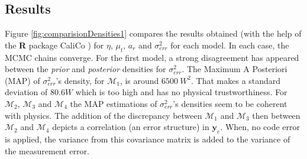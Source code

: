 \documentclass[soumission]{jsfds}
\begin{document}
\subsection{Results}

Figure \ref{fig:comparisionDensities1} compares the results obtained (with the help of the \textbf{R} package CaliCo \citep{CaliCo}) 
for $\eta$, $\mu_t$, $a_r$ and $\sigma_{err}^2$ for each model. In each case, the MCMC chains converge. 
For the first model, a strong disagreement has appeared between the \textit{prior} and \textit{posterior} densities for $\sigma_{err}^2$. 
The Maximum A Posteriori (MAP) of $\sigma_{err}^2$'s density, for $\mathcal{M}_1$,
 is around $6500\ W^2$. That makes a standard deviation of $80.6W$ which is too high and has no physical trustworthiness. 
For $\mathcal{M}_2$, $\mathcal{M}_3$ and $\mathcal{M}_4$ the MAP estimations of $\sigma_{err}^2$'s densities seem to be coherent with physics. The addition of the discrepancy between $\mathcal{M}_1$ and $\mathcal{M}_3$ then between $\mathcal{M}_2$ and $\mathcal{M}_4$ depicts a correlation (an error structure) in $\boldsymbol{y}_e$. When, no code error is applied, the variance from this covariance matrix is added to the variance of the measurement error. \newline
\end{document}
